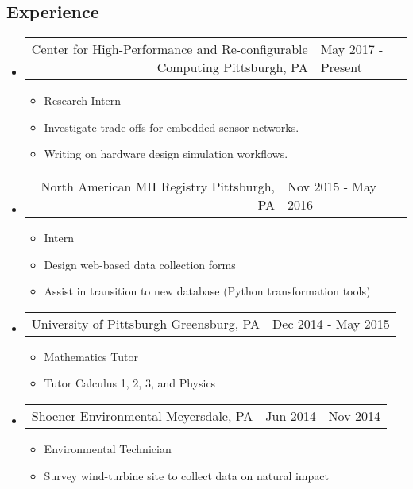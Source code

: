 \documentclass[18pt]{article}
\makeatletter
\providecommand{\tightlist}{
    \setlength{\itemsep}{0pt}\setlength{\parskip}{0pt}
}
\providecommand{\datetable}[2]{
    \begin{tabular*}{\textwidth}{r @{\extracolsep{\fill}} l}
        #1 & #2
    \end{tabular*}
}
\makeatother
\begin{document}
    \subsection*{Experience}\label{experience}
      \begin{itemize}\tightlist
        
        \item
        \datetable
            {Center for High-Performance and Re-configurable Computing \textbar{} Pittsburgh, PA}
            {May 2017 - Present}
        \begin{itemize}\tightlist
          \item Research Intern
          \item Investigate trade-offs for embedded sensor networks.
          \item Writing on hardware design simulation workflows.
      	\end{itemize}
        
        \item
        \datetable
            {North American MH Registry \textbar{} Pittsburgh, PA}
            {Nov 2015 - May 2016}
        \begin{itemize}\tightlist
          \item Intern
          \item Design web-based data collection forms
          \item Assist in transition to new database (Python transformation tools)
        \end{itemize}

        \item \datetable
            {University of Pittsburgh \textbar{} Greensburg, PA}
            {Dec 2014 - May 2015}
        \begin{itemize}\tightlist
          \item Mathematics Tutor
          \item Tutor Calculus 1, 2, 3, and Physics
        \end{itemize}
        
        \item \datetable 
            {Shoener Environmental \textbar{} Meyersdale, PA}
            {Jun 2014 - Nov 2014}
        \begin{itemize}\tightlist
          \item Environmental Technician
          \item Survey wind-turbine site to collect data on natural impact
        \end{itemize}

      \end{itemize} %
      
\end{document}
